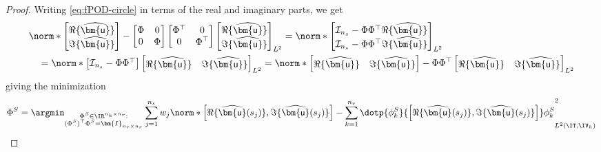 \begin{proof}
    Writing  \cref{eq:fPOD-circle} in terms of the real and imaginary parts, we get
    \begin{align}
        &\norm*{
        \begin{bmatrix}
            \Re \{ \widehat{\bm{\mathsf{u}}} \} \\
            \Im \{ \widehat{\bm{\mathsf{u}}} \}
        \end{bmatrix} -
        \begin{bmatrix}
            \Phi & 0 \\
            0 & \Phi
        \end{bmatrix}
        \begin{bmatrix}
            \Phi^\top & 0 \\
            0 & \Phi^\top
        \end{bmatrix}
        \begin{bmatrix}
            \Re \{ \widehat{\bm{\mathsf{u}}} \} \\
            \Im \{ \widehat{\bm{\mathsf{u}}} \}
        \end{bmatrix}
        }_{L^2} =
        \norm*{
        \begin{bmatrix}
            \mathcal{I}_{n_s} -\Phi \Phi^\top \Re \{ \widehat{\bm{\mathsf{u}}} \} \\
            \mathcal{I}_{n_s} -\Phi \Phi^\top \Im \{ \widehat{\bm{\mathsf{u}}} \}
        \end{bmatrix}
        }_{L^2} \\ \vspace{0.2cm}
        &\quad = \norm*{
        \begin{bmatrix}
            \mathcal{I}_{n_s} -\Phi \Phi^\top
        \end{bmatrix}
        \begin{bmatrix}
            \Re \{ \widehat{\bm{\mathsf{u}}} \} &
            \Im \{ \widehat{\bm{\mathsf{u}}} \}
        \end{bmatrix}
        }_{L^2}
        = \norm*{
        \begin{bmatrix}
            \Re \{ \widehat{\bm{\mathsf{u}}} \} &
            \Im \{ \widehat{\bm{\mathsf{u}}} \}
        \end{bmatrix} -
        \Phi \Phi^\top
        \begin{bmatrix}
            \Re \{ \widehat{\bm{\mathsf{u}}} \} &
            \Im \{ \widehat{\bm{\mathsf{u}}} \}
        \end{bmatrix}
        }_{L^2}
    \end{align}
    giving the minimization
    \begin{equation} \label{eq:fPOD-sym}
        \Phi^S =  \argmin_{\substack{\Phi^S \in \IR^{n_h \times n_r}: \\ (\Phi^S)^{\top} \Phi^S = \bm{I}_{n_r \times n_r}}}
        \sum_{j=1}^{n_s} w_j \norm*{ \left[ \Re \{\widehat{\bm{\mathsf{u}}}(s_j) \}, \Im \{\widehat{\bm{\mathsf{u}}}(s_j) \} \right] - \sum_{k=1}^{n_r} \dotp{\phi_k^S}{\left[ \Re \{\widehat{\bm{\mathsf{u}}}(s_j) \}, \Im \{\widehat{\bm{\mathsf{u}}}(s_j) \} \right]} \phi_k^S}^2_{L^2(\IT,\IV_h)}
\end{equation}
\end{proof}

